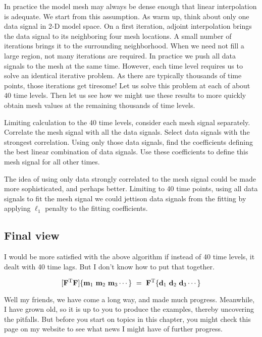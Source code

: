 \par
In practice the model mesh may always be dense enough
that linear interpolation is adequate.
We start from this assumption.
As warm up, think about only one data signal in 2-D model space.
On a first iteration, adjoint interpolation brings the data signal to its neighboring four mesh locations.
A small number of iterations brings it to the surrounding neighborhood.
When we need not fill a large region,
not many iterations are required.
In practice we push all data signals to the mesh at the same time.
However, each time level requires us to solve an identical iterative problem.
As there are typically thousands of time points, those iterations get tiresome!
Let us solve this problem at each of about $40$ time levels.
Then let us see how we might use these results
to more quickly obtain mesh values at the remaining thousands of time levels.
\par
Limiting calculation to the 40 time levels,
consider each mesh signal separately.
Correlate the mesh signal with all the data signals.
Select data signals with the strongest correlation.
Using only those data signals,
find the coefficients defining the best linear combination of data signals.
Use these coefficients to define this mesh signal for all other times.
\par
The idea of using only data strongly correlated to the mesh signal
could be made more sophisticated, and perhaps better.
Limiting to 40 time points,
using all data signals to fit the mesh signal
we could jettison data signals from the fitting
by applying $\ell_1$ penalty to the fitting coefficients.

\subsection{Final view}
I would be more satisfied with the above algorithm
if instead of 40 time levels,
it dealt with 40 time lags.
But I don't know how to put that together.

$$
[\bold F^{\rm T}\bold F] \{ \bold m_1\ \bold m_2\ \bold m_3 \cdots \} \ = \
\bold F^{\rm T}          \{ \bold d_1\ \bold d_2\ \bold d_3 \cdots \}
$$

\par
Well my friends,
we have come a long way,
and made much progress.
Meanwhile,
I have grown old,
so it is up to you to produce the examples,
thereby uncovering the pitfalls.
But before you start on topics in this chapter,
you might check this page on my website
to see what news I might have of further progress.


\clearpage

